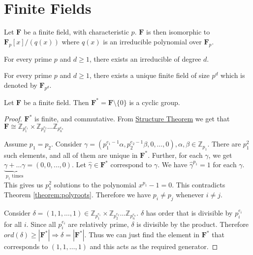 \section{Finite Fields}
\begin{theorem} \label{theorem:finitefieldiso}
  Let $\mathbf{F}$ be a finite field, with characteristic $p$.
  $\mathbf{F}$ is then isomorphic to $\mathbf{F}_{p}[x] / (q(x))$ where $q(x)$ is an irreducible polynomial over $\mathbf{F}_{p}$.
\end{theorem}
\begin{theorem} \label{theorem:finitefieldpoly}
  For every prime $p$ and $d \geq 1$, there exists an irreducible of degree $d$.
\end{theorem}
\begin{corollary} \label{cor:finitefieldprimes}
  For every prime $p$ and $d \geq 1$, there exists a unique finite field of size $p^{d}$ which is denoted by $\mathbf{F}_{p^{d}}$.
\end{corollary}
\begin{theorem} \label{theorem:finitefieldcyclic}
  Let $\mathbf{F}$ be a finite field.
  Then $\mathbf{F}^{*} = \mathbf{F} \setminus \{ 0 \}$ is a cyclic group.
\end{theorem}
\begin{proof} \label{proof:finitefieldcyclic}
  $\mathbf{F}^{*}$ is finite, and commutative.
  From \hyperref[def:finitegen]{Structure Theorem} we get that $\mathbf{F} \cong \mathbb{Z}_{p_{1}^{e_{1}}} \times \mathbb{Z}_{p_{2}^{e_{2}}} \dots \mathbb{Z}_{p_{n}^{e_{n}}}$
  \par
  Assume $p_{1} = p_{2}$.
  Consider $\gamma = (p_{1}^{e_{1} - 1} \alpha , p_{2}^{e_{2} - 1} \beta , 0, \dots, 0), \alpha, \beta \in \mathbb{Z}_{p_{1}}$.
  There are $p_{1}^{2}$ such elements, and all of them are unique in $\mathbf{F} ^{*}$.
  Further, for each $\gamma$, we get $\underbrace{\gamma + \dots \gamma}_{p_{1} \text{ times}} = (0, 0, \dots , 0)$.
  Let $\widehat{\gamma} \in \mathbf{F}^{*}$ correspond to $\gamma$.
  We have $\widehat{\gamma}^{p_{1}} = 1$ for each $\gamma$.
  This gives us $p_{1}^{2}$ solutions to the polynomial $x^{p_{1}} - 1 = 0$.
  This contradicts Theorem \ref{theorem:polyroots}.
  Therefore we have $p_{i} \neq p_{j}$ whenever $i \neq j$.
  \par
  Consider $\delta = (1, 1, \dots , 1) \in \mathbb{Z}_{p_{1}^{e_{1}}} \times \mathbb{Z}_{p_{2}^{e_{2}}} \dots \mathbb{Z}_{p_{n}^{e_{n}}}$.
  $\delta$ has order that is divisible by $p_{i}^{e_{i}}$ for all $i$.
  Since all $p_{i}^{e_{i}}$ are relatively prime, $\delta$ is divisible by the product.
  Therefore $ord(\delta) \geq | \mathbf{F}^{*} | \Rightarrow \delta = | \mathbf{F}^{*} |$.
  Thus we can just find the element in $\mathbf{F}^{*}$ that corresponds to $(1, 1, \dots , 1)$ and this acts as the required generator.
\end{proof}
